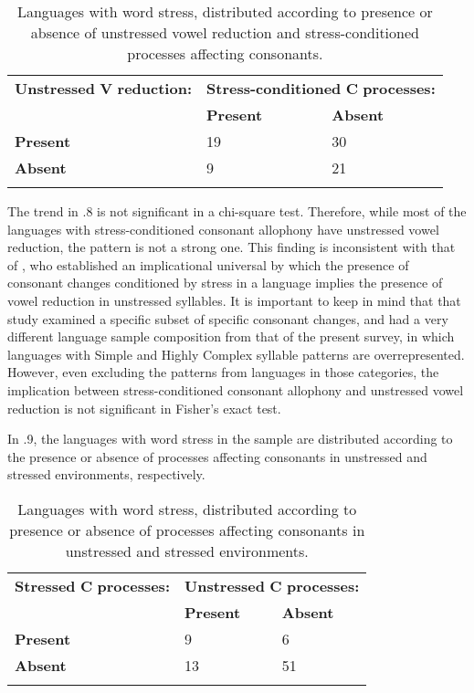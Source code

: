 \begin{table}
\begin{tabularx}{\textwidth}{XXX}
\lsptoprule
 \textbf{Unstressed} \textbf{V} \textbf{reduction:} & \multicolumn{2}{c}{ \textbf{Stress-conditioned} \textbf{C} \textbf{processes:}}\\
\hhline{-~~} & \textbf{Present} & \textbf{Absent}\\
 \textbf{Present} & 19 & 30\\
 \textbf{Absent} & 9 & 21\\
\lspbottomrule
\end{tabularx}
\caption{\label{5.8}Languages with word stress, distributed according to presence or absence of unstressed vowel reduction and stress-conditioned processes affecting consonants.}
\end{table}

  The trend in .8 is not significant in a chi-square test. Therefore, while most of the languages with stress-conditioned consonant allophony have unstressed vowel reduction, the pattern is not a strong one. This finding is inconsistent with that of \citet{BybeeEtAl1998}, who established an implicational universal by which the presence of consonant changes conditioned by stress in a language implies the presence of vowel reduction in unstressed syllables. It is important to keep in mind that that study examined a specific subset of specific consonant changes, and had a very different language sample composition from that of the present survey, in which languages with Simple and Highly Complex syllable patterns are overrepresented. However, even excluding the patterns from languages in those categories, the implication between stress-conditioned consonant allophony and unstressed vowel reduction is not significant in Fisher’s exact test.

   In .9, the languages with word stress in the sample are distributed according to the presence or absence of processes affecting consonants in unstressed and stressed environments, respectively.

\begin{table}
\begin{tabularx}{\textwidth}{XXX}
\lsptoprule
 \textbf{Stressed} \textbf{C} \textbf{processes:} & \multicolumn{2}{c}{ \textbf{Unstressed} \textbf{C} \textbf{processes:}}\\
\hhline{-~~} & \textbf{Present} & \textbf{Absent}\\
 \textbf{Present} & 9 & 6\\
 \textbf{Absent} & 13 & 51\\
\lspbottomrule
\end{tabularx}
\caption{\label{5.9}Languages with word stress, distributed according to presence or absence of processes affecting consonants in unstressed and stressed environments.}
\end{table}

